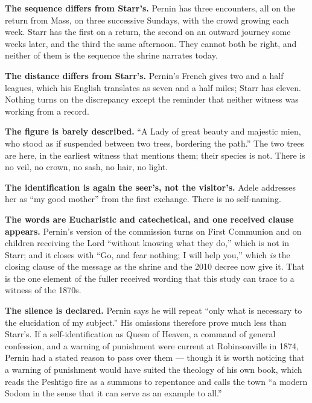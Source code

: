 \textbf{The sequence differs from Starr's.} Pernin has three
encounters, all on the return from Mass, on three successive Sundays,
with the crowd growing each week. Starr has the first on a return, the
second on an outward journey some weeks later, and the third the same
afternoon. They cannot both be right, and neither of them is the
sequence the shrine narrates today.

\textbf{The distance differs from Starr's.} Pernin's French gives two
and a half leagues, which his English translates as seven and a half
miles; Starr has eleven. Nothing turns on the discrepancy except the
reminder that neither witness was working from a record.

\textbf{The figure is barely described.} ``A Lady of great beauty and
majestic mien, who stood as if suspended between two trees, bordering
the path.'' The two trees are here, in the earliest witness that
mentions them; their species is not. There is no veil, no crown, no
sash, no hair, no light.

\textbf{The identification is again the seer's, not the visitor's.}
Adele addresses her as ``my good mother'' from the first exchange.
There is no self-naming.

\textbf{The words are Eucharistic and catechetical, and one received
clause appears.} Pernin's version of the commission turns on First
Communion and on children receiving the Lord ``without knowing what
they do,'' which is not in Starr; and it closes with ``Go, and fear
nothing; I will help you,'' which \emph{is} the closing clause of the
message as the shrine and the 2010 decree now give it. That is the one
element of the fuller received wording that this study can trace to a
witness of the 1870s.

\textbf{The silence is declared.} Pernin says he will repeat ``only
what is necessary to the elucidation of my subject.'' His omissions
therefore prove much less than Starr's. If a self-identification as
Queen of Heaven, a command of general confession, and a warning of
punishment were current at Robinsonville in 1874, Pernin had a stated
reason to pass over them --- though it is worth noticing that a warning
of punishment would have suited the theology of his own book, which
reads the Peshtigo fire as a summons to repentance and calls the town
``a modern Sodom in the sense that it can serve as an example to
all.''

